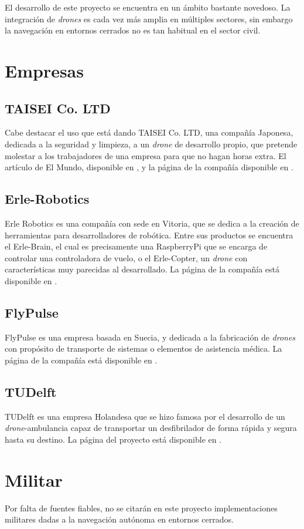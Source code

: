 
El desarrollo de este proyecto se encuentra en un ámbito bastante novedoso. La integración de \emph{drones} es cada vez más amplia en múltiples sectores, sin embargo la navegación en entornos cerrados no es tan habitual en el sector civil. 



\section{Empresas}

\subsection{TAISEI Co. LTD}
Cabe destacar el uso que está dando TAISEI Co. LTD, una compañía Japonesa, dedicada a la seguridad y limpieza, a un \emph{drone} de desarrollo propio, que pretende molestar a los trabajadores de una empresa para que no hagan horas extra.
El artículo de El Mundo, disponible en \citep{art:taisei}, y la página de la compañía disponible en \citep{wiki:taisei}.

\subsection{Erle-Robotics}
Erle Robotics es una compañía con sede en Vitoria, que se dedica a la creación de herramientas para desarrolladores de robótica. Entre sus productos se encuentra el Erle-Brain, el cual es precisamente una RaspberryPi que se encarga de controlar una controladora de vuelo, o el Erle-Copter, un \emph{drone} con características muy parecidas al desarrollado. La página de la compañía está disponible en \citep{wiki:erle}.

\subsection{FlyPulse}
FlyPulse es una empresa basada en Suecia, y dedicada a la fabricación de \emph{drones} con propósito de transporte de sistemas o elementos de asistencia médica. La página de la compañía está disponible en \citep{wiki:flypulse}.

\subsection{TUDelft} 
TUDelft es una empresa Holandesa que se hizo famosa por el desarrollo de un \emph{drone}-ambulancia capaz de transportar un desfibrilador de forma rápida y segura hasta su destino. La página del proyecto está disponible en \citep{wiki:tudelft}.


\section{Militar}
Por falta de fuentes fiables, no se citarán en este proyecto implementaciones militares dadas a la navegación autónoma en entornos cerrados.
